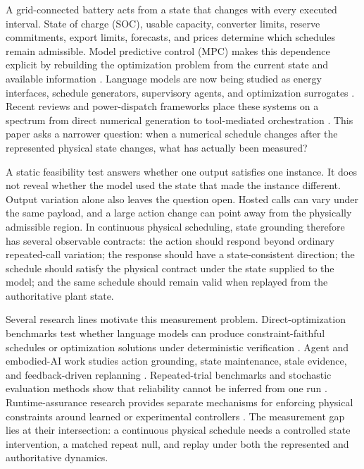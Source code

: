 \documentclass[11pt]{article}
\begin{document}
A grid-connected battery acts from a state that changes with every executed interval. State of
charge (SOC), usable capacity, converter limits, reserve commitments, export limits, forecasts,
and prices determine which schedules remain admissible. Model predictive control (MPC) makes this
dependence explicit by rebuilding the optimization problem from the current state and available
information \cite{parisio2014mpc,cedeno2022pvmpc,banfield2020empc}. Language models are now being
studied as energy interfaces, schedule generators, supervisory agents, and optimization surrogates
\cite{mongaillard2024power,michelon2025llmhems,cheng2025dispatch,elmakroum2026agentic,
raghavan2026costoptimal,haghighi2026surrogate}. Recent reviews and power-dispatch frameworks place
these systems on a spectrum from direct numerical generation to tool-mediated orchestration
\cite{zhang2026energysystems,zhao2026dispatchagent,zhao2026carbonagent}. This paper asks a narrower
question: when a numerical schedule changes after the represented physical state changes, what has
actually been measured?

A static feasibility test answers whether one output satisfies one instance. It does not reveal
whether the model used the state that made the instance different. Output variation alone also
leaves the question open. Hosted calls can vary under the same payload, and a large action change
can point away from the physically admissible region. In continuous physical scheduling, state
grounding therefore has several observable contracts: the action should respond beyond ordinary
repeated-call variation; the response should have a state-consistent direction; the schedule
should satisfy the physical contract under the state supplied to the model; and the same schedule
should remain valid when replayed from the authoritative plant state.

Several research lines motivate this measurement problem. Direct-optimization benchmarks test
whether language models can produce constraint-faithful schedules or optimization solutions under
deterministic verification \cite{tso2026constraintbench,jiang2026poweratlas,sharma2026schedbench}.
Agent and embodied-AI work studies action grounding, state maintenance, stale evidence, and
feedback-driven replanning \cite{huang2022zeroshot,ahn2022saycan,huang2023innermonologue,
yoneda2024statler,wang2025groundact,sheng2026envtrust,chao2026stale}. Repeated-trial benchmarks and
stochastic evaluation methods show that reliability cannot be inferred from one run
\cite{cui2026sameprompt,lior2025reliableeval,yao2024taubench}. Runtime-assurance research provides
separate mechanisms for enforcing physical constraints around learned or experimental controllers
\cite{seto1998simplex,alshiekh2018shielding,wabersich2021safetyfilter}. The measurement gap lies at
their intersection: a continuous physical schedule needs a controlled state intervention, a
matched repeat null, and replay under both the represented and authoritative dynamics.
\end{document}
